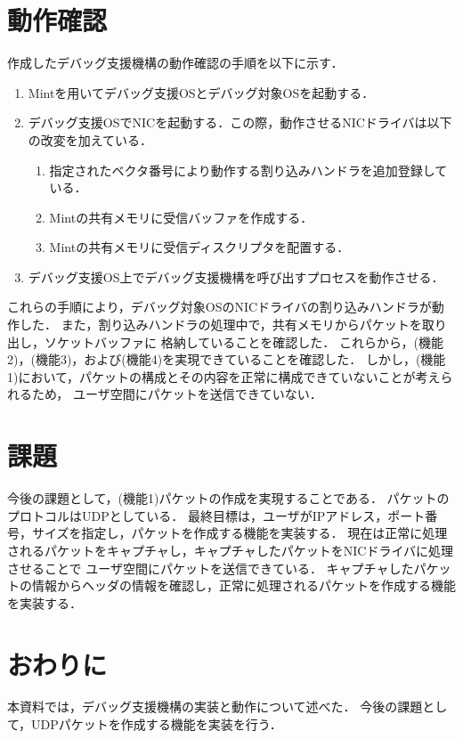 \documentclass[12pt]{jsarticle}
\begin{document}
\section{動作確認}
作成したデバッグ支援機構の動作確認の手順を以下に示す．
\begin{enumerate}
    \item Mintを用いてデバッグ支援OSとデバッグ対象OSを起動する．
    \item デバッグ支援OSでNICを起動する．この際，動作させるNICドライバは以下の改変を加えている．
        \begin{enumerate}
            \item 指定されたベクタ番号により動作する割り込みハンドラを追加登録している．
            \item Mintの共有メモリに受信バッファを作成する．
            \item Mintの共有メモリに受信ディスクリプタを配置する．
        \end{enumerate}
    \item デバッグ支援OS上でデバッグ支援機構を呼び出すプロセスを動作させる．
\end{enumerate}
これらの手順により，デバッグ対象OSのNICドライバの割り込みハンドラが動作した．
また，割り込みハンドラの処理中で，共有メモリからパケットを取り出し，ソケットバッファに
格納していることを確認した．
これらから，(機能2)，(機能3)，および(機能4)を実現できていることを確認した．
しかし，(機能1)において，パケットの構成とその内容を正常に構成できていないことが考えられるため，
ユーザ空間にパケットを送信できていない．

\section{課題}
今後の課題として，(機能1)パケットの作成を実現することである．
パケットのプロトコルはUDPとしている．
最終目標は，ユーザがIPアドレス，ポート番号，サイズを指定し，パケットを作成する機能を実装する．
現在は正常に処理されるパケットをキャプチャし，キャプチャしたパケットをNICドライバに処理させることで
ユーザ空間にパケットを送信できている．
キャプチャしたパケットの情報からヘッダの情報を確認し，正常に処理されるパケットを作成する機能を実装する．

\section{おわりに}
本資料では，デバッグ支援機構の実装と動作について述べた．
今後の課題として，UDPパケットを作成する機能を実装を行う．
\end{document}
